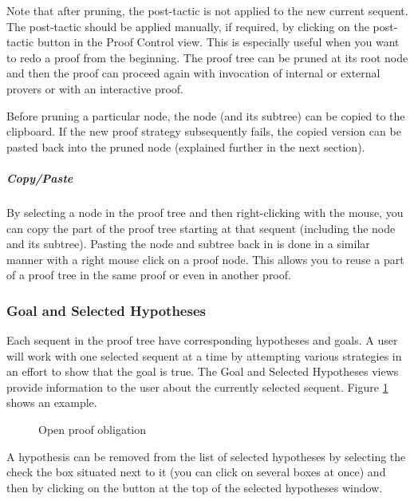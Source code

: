 Note that after pruning, the post-tactic is not applied to the new current sequent. The post-tactic should be applied manually, if required, by clicking on the post-tactic button in the Proof Control view. This is especially useful when you want to redo a proof from the beginning. The proof tree can be pruned at its root node and then the proof can proceed again with invocation of internal or external provers or with an interactive proof.

Before pruning a particular node, the node (and its subtree) can be copied to the clipboard. If the new proof strategy subsequently fails, the copied version can be pasted back into the pruned node (explained further in the next section). 

\subparagraph{Copy/Paste}

By selecting a node in the proof tree and then right-clicking with the mouse, you can copy the part of the proof tree starting at that sequent (including the node and its subtree). Pasting the node and subtree back in is done in a similar manner with a right mouse click on a proof node. This allows you to reuse a part of a proof tree in the same proof or even in another proof.

\subsubsection{Goal and Selected Hypotheses}
\label{goal_view}

Each sequent in the proof tree have corresponding hypotheses and goals. A user will work with one selected sequent at a time by attempting various strategies in an effort to show that the goal is true. The \textsf{Goal} and \textsf{Selected Hypotheses} views provide information to the user about the currently selected sequent. Figure \ref{fig_ref_01_proving_perspective3} shows an example.

\begin{figure}[!ht]
\begin{center}
	\caption{Open proof obligation}
	\label{fig_ref_01_proving_perspective3}
\end{center}
\end{figure}

A hypothesis can be removed from the list of selected hypotheses by selecting the check the box situated next to it (you can click on several boxes at once) and then by clicking on the  button at the top of the selected hypotheses window.

